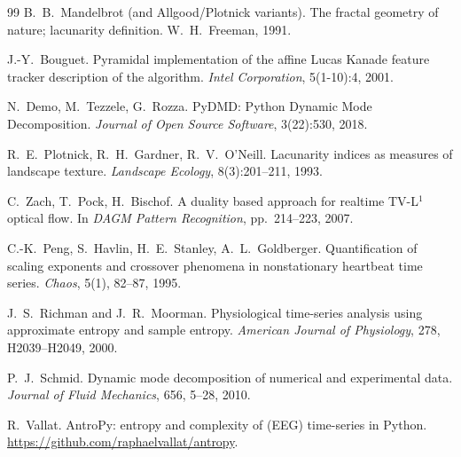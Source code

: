\documentclass[11pt,a4paper]{article}
\begin{document}
\begin{thebibliography}{99}
B.~B.~Mandelbrot (and Allgood/Plotnick variants).
\newblock The fractal geometry of nature; lacunarity definition.
\newblock W.~H.~Freeman, 1991.

J.-Y.~Bouguet.
\newblock Pyramidal implementation of the affine Lucas Kanade feature tracker
description of the algorithm.
\newblock \emph{Intel Corporation}, 5(1-10):4, 2001.

N.~Demo, M.~Tezzele, G.~Rozza.
\newblock PyDMD: Python Dynamic Mode Decomposition.
\newblock \emph{Journal of Open Source Software}, 3(22):530, 2018.

R.~E.~Plotnick, R.~H.~Gardner, R.~V.~O'Neill.
\newblock Lacunarity indices as measures of landscape texture.
\newblock \emph{Landscape Ecology}, 8(3):201--211, 1993.

C.~Zach, T.~Pock, H.~Bischof.
\newblock A duality based approach for realtime TV-L$^1$ optical flow.
\newblock In \emph{DAGM Pattern Recognition}, pp.~214--223, 2007.

C.-K.~Peng, S.~Havlin, H.~E.~Stanley, A.~L.~Goldberger.
\newblock Quantification of scaling exponents and crossover phenomena in
nonstationary heartbeat time series.
\newblock \emph{Chaos}, 5(1), 82--87, 1995.

J.~S.~Richman and J.~R.~Moorman.
\newblock Physiological time-series analysis using approximate entropy and
sample entropy.
\newblock \emph{American Journal of Physiology}, 278, H2039--H2049, 2000.

P.~J.~Schmid.
\newblock Dynamic mode decomposition of numerical and experimental data.
\newblock \emph{Journal of Fluid Mechanics}, 656, 5--28, 2010.

R.~Vallat.
\newblock AntroPy: entropy and complexity of (EEG) time-series in Python.
\newblock \url{https://github.com/raphaelvallat/antropy}.

\end{thebibliography}
\endgroup
\end{document}

